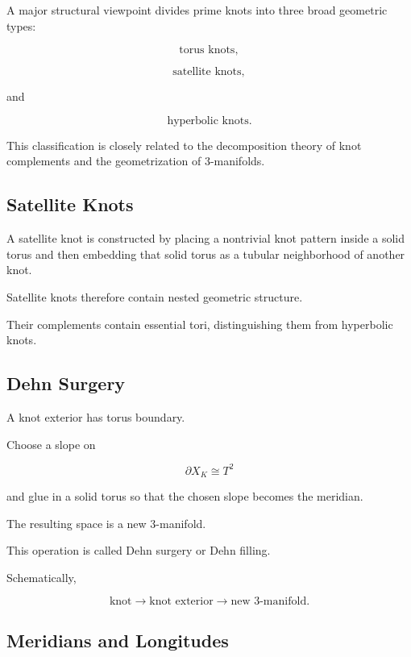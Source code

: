 A major structural viewpoint divides prime knots into three broad geometric
types:

\[
\boxed{
\text{torus knots},
}
\]

\[
\boxed{
\text{satellite knots},
}
\]

and

\[
\boxed{
\text{hyperbolic knots}.
}
\]

This classification is closely related to the decomposition theory of knot
complements and the geometrization of \(3\)-manifolds.

\subsection{Satellite Knots}
\label{subsec:satellite-knots}

A satellite knot is constructed by placing a nontrivial knot pattern inside
a solid torus and then embedding that solid torus as a tubular neighborhood
of another knot.

Satellite knots therefore contain nested geometric structure.

Their complements contain essential tori, distinguishing them from
hyperbolic knots.

\subsection{Dehn Surgery}
\label{subsec:knot-dehn-surgery}

A knot exterior has torus boundary.

Choose a slope on

\[
\partial X_K\cong T^2
\]

and glue in a solid torus so that the chosen slope becomes the meridian.

The resulting space is a new \(3\)-manifold.

This operation is called Dehn surgery or Dehn filling.

Schematically,

\[
\boxed{
\text{knot}
\longrightarrow
\text{knot exterior}
\longrightarrow
\text{new }3\text{-manifold}.
}
\]

\subsection{Meridians and Longitudes}
\label{subsec:knot-meridian-longitude}

